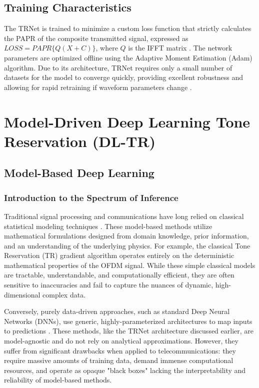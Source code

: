 \subsection{Training Characteristics}
The TRNet is trained to minimize a custom loss function that strictly calculates the PAPR of the composite transmitted signal, expressed as $LOSS = PAPR\{Q(X+C)\}$, where $Q$ is the IFFT matrix \cite{trnet}. The network parameters are optimized offline using the Adaptive Moment Estimation (Adam) algorithm. Due to its architecture, TRNet requires only a small number of datasets for the model to converge quickly, providing excellent robustness and allowing for rapid retraining if waveform parameters change \cite{trnet}.

\section{Model-Driven Deep Learning Tone Reservation (DL-TR)}
\subsection{Model-Based Deep Learning}

\subsubsection{Introduction to the Spectrum of Inference}
Traditional signal processing and communications have long relied on classical statistical modeling techniques \cite{modelbased}. These model-based methods utilize mathematical formulations designed from domain knowledge, prior information, and an understanding of the underlying physics. For example, the classical Tone Reservation (TR) gradient algorithm operates entirely on the deterministic mathematical properties of the OFDM signal. While these simple classical models are tractable, understandable, and computationally efficient, they are often sensitive to inaccuracies and fail to capture the nuances of dynamic, high-dimensional complex data.

Conversely, purely data-driven approaches, such as standard Deep Neural Networks (DNNs), use generic, highly-parameterized architectures to map inputs to predictions \cite{modelbased}. These methods, like the TRNet architecture discussed earlier, are model-agnostic and do not rely on analytical approximations. However, they suffer from significant drawbacks when applied to telecommunications: they require massive amounts of training data, demand immense computational resources, and operate as opaque "black boxes" lacking the interpretability and reliability of model-based methods.

